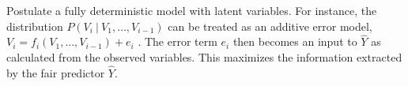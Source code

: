  Postulate a fully deterministic model with
latent variables. For instance, the distribution $P(V_i\ |\ V_1,
\dots, V_{i - 1})$ can be treated as an additive error model, $V_i
\!=\! f_i(V_1, \dots, V_{i - 1}) \!+\! e_i$ \citep{peters:14}. The
error term $e_i$ then becomes an input to $\hat Y$ as calculated from
the observed variables. This maximizes the information extracted by
the fair predictor $\hat Y$.


